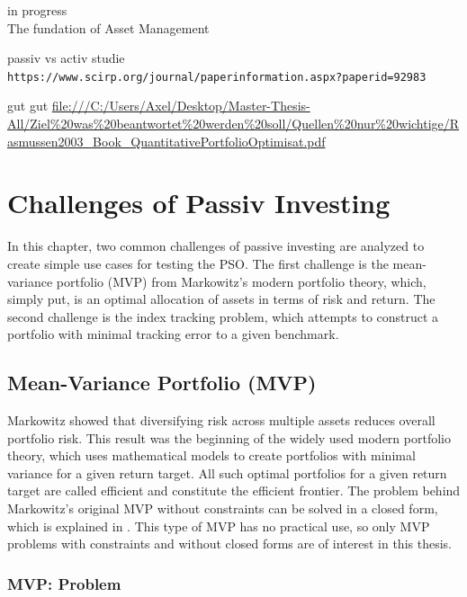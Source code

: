 \documentclass[
  oneside]{book}
\begin{document}
\textbar\textbar\textbar in progress\textbar\textbar\textbar{}\\
The fundation of Asset Management

passiv vs activ studie
\texttt{https://www.scirp.org/journal/paperinformation.aspx?paperid=92983}

gut gut
\url{file:///C:/Users/Axel/Desktop/Master-Thesis-All/Ziel\%20was\%20beantwortet\%20werden\%20soll/Quellen\%20nur\%20wichtige/Rasmussen2003_Book_QuantitativePortfolioOptimisat.pdf}

\hypertarget{challenges}{%
\chapter{Challenges of Passiv Investing}\label{challenges}}

In this chapter, two common challenges of passive investing are analyzed to create simple use cases for testing the PSO. The first challenge is the mean-variance portfolio (MVP) from Markowitz's modern portfolio theory, which, simply put, is an optimal allocation of assets in terms of risk and return. The second challenge is the index tracking problem, which attempts to construct a portfolio with minimal tracking error to a given benchmark.

\hypertarget{mean-variance-portfolio-mvp}{%
\section{Mean-Variance Portfolio (MVP)}\label{mean-variance-portfolio-mvp}}

Markowitz showed that diversifying risk across multiple assets reduces overall portfolio risk. This result was the beginning of the widely used modern portfolio theory, which uses mathematical models to create portfolios with minimal variance for a given return target. All such optimal portfolios for a given return target are called efficient and constitute the efficient frontier. The problem behind Markowitz's original MVP without constraints can be solved in a closed form, which is explained in \citep{Eric2021}. This type of MVP has no practical use, so only MVP problems with constraints and without closed forms are of interest in this thesis.

\hypertarget{mvp-problem}{%
\subsection{MVP: Problem}\label{mvp-problem}}
\end{document}
